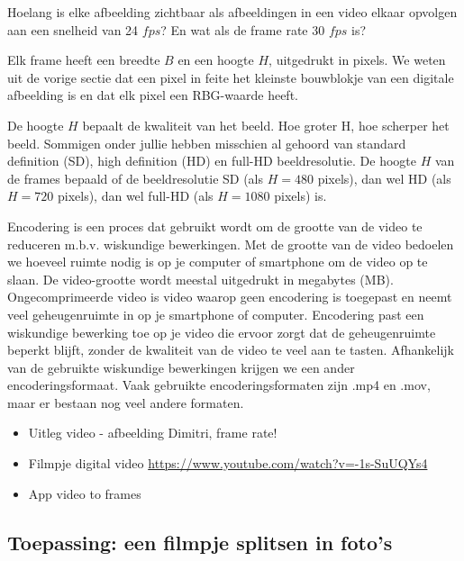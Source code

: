 \begin{oef}
	Hoelang is elke afbeelding zichtbaar als afbeeldingen in een video elkaar opvolgen aan een snelheid van 24 $fps$? 
	En wat als de frame rate 30 $fps$ is?
\end{oef}

Elk frame heeft een breedte $B$ en een hoogte $H$, uitgedrukt in pixels.
We weten uit de vorige sectie dat een pixel in feite het kleinste bouwblokje van een digitale afbeelding is en dat elk pixel een RBG-waarde heeft.


De hoogte $H$ bepaalt de kwaliteit van het beeld. Hoe groter H, hoe scherper het beeld. Sommigen onder jullie hebben misschien al gehoord van standard definition (SD), high definition (HD) en full-HD beeldresolutie. 
De hoogte $H$ van de frames bepaald of de beeldresolutie SD (als $H=480$ pixels), dan wel HD (als $H=720$ pixels), dan wel full-HD (als $H=1080$ pixels) is.

Encodering is een proces dat gebruikt wordt om de grootte van de video te reduceren m.b.v. wiskundige bewerkingen. Met de grootte van de video bedoelen we hoeveel ruimte nodig is op je computer of smartphone om de video op te slaan. De video-grootte wordt meestal uitgedrukt in megabytes (MB). Ongecomprimeerde video is video waarop geen encodering is toegepast en neemt veel geheugenruimte in op je smartphone of computer. Encodering past een wiskundige bewerking toe op je video die ervoor zorgt dat de geheugenruimte beperkt blijft, zonder de kwaliteit van de video te veel aan te tasten. Afhankelijk van de gebruikte wiskundige bewerkingen krijgen we een ander encoderingsformaat. Vaak gebruikte encoderingsformaten zijn .mp4 en .mov, maar er bestaan nog veel andere formaten.

\begin{itemize}
	\item Uitleg video - afbeelding Dimitri, frame rate!
	\item Filmpje digital video \url{https://www.youtube.com/watch?v=-1s-SuUQYs4}
	\item App video to frames
\end{itemize}

\subsection{Toepassing: een filmpje splitsen in foto's}

